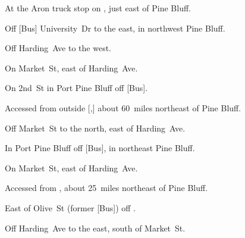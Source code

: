 
\begin{LocationList}

At the Aron truck stop on  , just east of Pine Bluff.

Off [Bus] University~Dr to the east, in northwest Pine Bluff.

Off Harding~Ave to the west.

On Market~St, east of Harding~Ave.

\Location{\GarageHQ \Garage}
On 2nd~St in Port Pine Bluff off [Bus].

Accessed from   outside [,] about 60~miles northeast of Pine Bluff.

Off Market~St to the north, east of Harding~Ave.

In Port Pine Bluff off [Bus], in northeast Pine Bluff.

\Location{\RecruitmentAgency \Recruitment}
On Market~St, east of Harding~Ave.

Accessed from  , about 25~miles northeast of Pine Bluff.

East of  Olive~St (former [Bus]) off .

Off Harding~Ave to the east, south of Market~St.

\end{LocationList}
